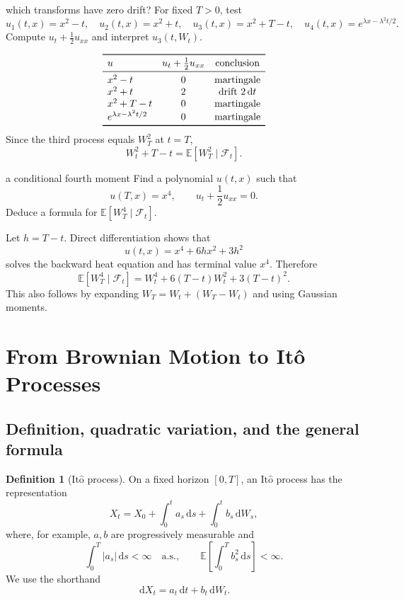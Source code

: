 \documentclass[10pt]{article}
\newcommand{\E}{\mathbb E}
\newcommand{\1}{\mathbf 1}
\newcommand{\cF}{\mathcal F}
\newcommand{\dd}{\,\mathrm d}
\newcommand{\Ito}{\mathrm{It\hat{o}}}
\theoremstyle{definition}
\newtheorem{definition}{Definition}[section]
\begin{document}
\begin{studentexercise}{which transforms have zero drift?}
For fixed \(T>0\), test
\[
u_1(t,x)=x^2-t,\quad
u_2(t,x)=x^2+t,\quad
u_3(t,x)=x^2+T-t,\quad
u_4(t,x)=e^{\lambda x-\lambda^2t/2}.
\]
Compute \(u_t+\tfrac12u_{xx}\) and interpret \(u_3(t,W_t)\).
\end{studentexercise}
\begin{shortsolution}
\[
\begin{array}{lcc}
\toprule
u & u_t+\frac12u_{xx} & \text{conclusion}\\
\midrule
x^2-t & 0 & \text{martingale}\\
x^2+t & 2 & \text{drift }2\dd t\\
x^2+T-t & 0 & \text{martingale}\\
e^{\lambda x-\lambda^2t/2} & 0 & \text{martingale}\\
\bottomrule
\end{array}
\]
Since the third process equals \(W_T^2\) at \(t=T\),
\[
W_t^2+T-t=\E[W_T^2\mid\cF_t].
\]
\end{shortsolution}

\begin{studentexercise}{a conditional fourth moment}
Find a polynomial \(u(t,x)\) such that
\[
u(T,x)=x^4,\qquad u_t+\frac12u_{xx}=0.
\]
Deduce a formula for \(\E[W_T^4\mid\cF_t]\).
\end{studentexercise}
\begin{shortsolution}
Let \(h=T-t\). Direct differentiation shows that
\[
u(t,x)=x^4+6hx^2+3h^2
\]
solves the backward heat equation and has terminal value \(x^4\). Therefore
\[
\boxed{
\E[W_T^4\mid\cF_t]
=W_t^4+6(T-t)W_t^2+3(T-t)^2.}
\]
This also follows by expanding
\(W_T=W_t+(W_T-W_t)\) and using Gaussian moments.
\end{shortsolution}

\section{From Brownian Motion to It\^o Processes}

\subsection{Definition, quadratic variation, and the general formula}

\begin{definition}[\(\Ito\) process]
On a fixed horizon \([0,T]\), an \(\Ito\) process has the representation
\[
X_t=X_0+\int_0^t a_s\dd s+\int_0^t b_s\dd W_s,
\]
where, for example, \(a,b\) are progressively measurable and
\[
\int_0^T|a_s|\dd s<\infty\quad\text{a.s.},
\qquad
\E\left[\int_0^Tb_s^2\dd s\right]<\infty.
\]
We use the shorthand
\[
\dd X_t=a_t\dd t+b_t\dd W_t.
\]
\end{definition}
\end{document}
